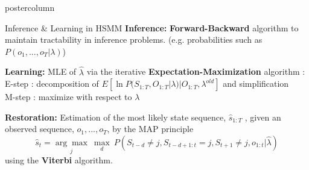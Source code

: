 \documentclass[final,hyperref={pdfpagelabels=false}]{beamer}
\newlength{\columnheight}
\begin{document}
\begin{frame}
\begin{columns}
    \begin{column}{.50\textwidth}
      \begin{beamercolorbox}[center,wd=\textwidth]{postercolumn}
        \begin{minipage}[T]{.98\textwidth} %
          \parbox[t][\columnheight]{\textwidth}{ %
            \begin{block}{Inference \& Learning in HSMM}
                \textbf{Inference:}
                \textbf{Forward-Backward} algorithm to maintain tractability in inference problems.
                (e.g. probabilities such as $P(o_1, ..., o_T | \lambda)$)

                \vskip0.5cm
                \textbf{Learning:}
                MLE of $\hat\lambda$ via the iterative \textbf{Expectation-Maximization} algorithm :\\
                E-step : decomposition of $E[\ln P(S_{1:T}, O_{1:T} | \lambda) | O_{1:T}, \lambda^{old}]$ and simplification\\
                M-step : maximize with respect to $\lambda$

                \vskip0.5cm
                \textbf{Restoration:} Estimation of the most likely state sequence, $\hat s_{1:T}$ ,
                given an observed sequence, $o_1, ..., o_T$, by the MAP principle
                { $$\hat s_t = \underset{j}{\arg\max}~\underset{d}{\max}~P(S_{t-d} \neq j, S_{t-d+1:t} = j, S_{t+1} \neq j, o_{1:t} | \hat\lambda)$$}
                using the \textbf{Viterbi} algorithm.
            \end{block}

}
\end{minipage}
\end{beamercolorbox}
\end{column}
\end{columns}
\end{frame}
\end{document}

